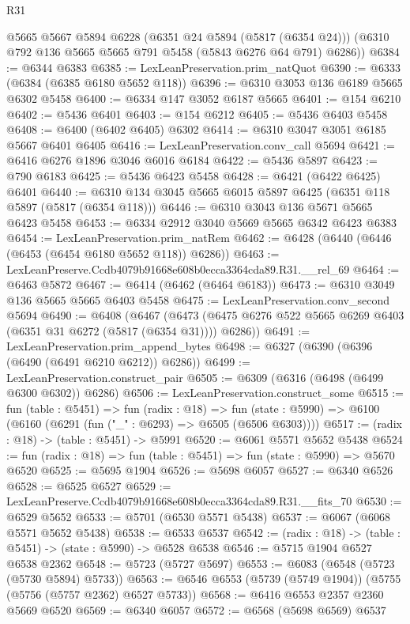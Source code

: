 \begin{lexlean}{R31}
\begin{coremodule}
      @5665
      @5667
      @5894
      @6228
      (@6351 @24 @5894 (@5817 (@6354 @24)))
      (@6310 @792 @136 @5665 @5665 @791 @5458 (@5843 @6276 @64 @791) @6286))
@6384 := @6344 @6383
@6385 := LexLeanPreservation.prim_natQuot
@6390 := @6333 (@6384 (@6385 @6180 @5652 @118))
@6396 := @6310 @3053 @136 @6189 @5665 @6302 @5458
@6400 := @6334 @147 @3052 @6187 @5665
@6401 := @154 @6210
@6402 := @5436 @6401
@6403 := @154 @6212
@6405 := @5436 @6403 @5458
@6408 := @6400 (@6402 @6405) @6302
@6414 := @6310 @3047 @3051 @6185 @5667 @6401 @6405
@6416 := LexLeanPreservation.conv_call @5694
@6421 := @6416 @6276 @1896 @3046 @6016 @6184
@6422 := @5436 @5897
@6423 := @790 @6183
@6425 := @5436 @6423 @5458
@6428 := @6421 (@6422 @6425) @6401
@6440 := @6310 @134 @3045 @5665 @6015 @5897 @6425 (@6351 @118 @5897 (@5817 (@6354 @118)))
@6446 := @6310 @3043 @136 @5671 @5665 @6423 @5458
@6453 := @6334 @2912 @3040 @5669 @5665 @6342 @6423 @6383
@6454 := LexLeanPreservation.prim_natRem
@6462 := @6428 (@6440 (@6446 (@6453 (@6454 @6180 @5652 @118)) @6286))
@6463 := LexLeanPreserve.Ccdb4079b91668e608b0ecca3364cda89.R31.__rel_69
@6464 := @6463 @5872
@6467 := @6414 (@6462 (@6464 @6183))
@6473 := @6310 @3049 @136 @5665 @5665 @6403 @5458
@6475 := LexLeanPreservation.conv_second @5694
@6490 := @6408
    (@6467 (@6473 (@6475 @6276 @522 @5665 @6269 @6403 (@6351 @31 @6272 (@5817 (@6354 @31)))) @6286))
@6491 := LexLeanPreservation.prim_append_bytes
@6498 := @6327 (@6390 (@6396 (@6490 (@6491 @6210 @6212)) @6286))
@6499 := LexLeanPreservation.construct_pair
@6505 := @6309 (@6316 (@6498 (@6499 @6300 @6302)) @6286)
@6506 := LexLeanPreservation.construct_some
@6515 := fun (table : @5451) =>
  fun (radix : @18) =>
  fun (state : @5990) => @6100 (@6160 (@6291 (fun ("_" : @6293) => @6505 (@6506 @6303))))
@6517 := (radix : @18) -> (table : @5451) -> @5991
@6520 := @6061 @5571 @5652 @5438
@6524 := fun (radix : @18) => fun (table : @5451) => fun (state : @5990) => @5670 @6520
@6525 := @5695 @1904
@6526 := @5698 @6057
@6527 := @6340 @6526
@6528 := @6525 @6527
@6529 := LexLeanPreserve.Ccdb4079b91668e608b0ecca3364cda89.R31.__fits_70
@6530 := @6529 @5652
@6533 := @5701 (@6530 @5571 @5438)
@6537 := @6067 (@6068 @5571 @5652 @5438)
@6538 := @6533 @6537
@6542 := (radix : @18) -> (table : @5451) -> (state : @5990) -> @6528 @6538
@6546 := @5715 @1904 @6527 @6538 @2362
@6548 := @5723 (@5727 @5697)
@6553 := @6083 (@6548 (@5723 (@5730 @5894) @5733))
@6563 := @6546 @6553 (@5739 (@5749 @1904)) (@5755 (@5756 (@5757 @2362) @6527 @5733))
@6568 := @6416 @6553 @2357 @2360 @5669 @6520
@6569 := @6340 @6057
@6572 := @6568 (@5698 @6569) @6537

\end{coremodule}
\end{lexlean}

